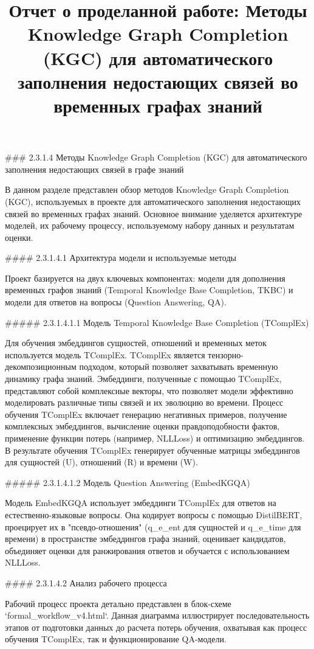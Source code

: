 \documentclass{article}
\title{Отчет о проделанной работе: Методы Knowledge Graph Completion (KGC) для автоматического заполнения недостающих связей во временных графах знаний}
\author{}
\date{}
\begin{document}
\maketitle

### 2.3.1.4 Методы Knowledge Graph Completion (KGC) для автоматического заполнения недостающих связей в графе знаний

В данном разделе представлен обзор методов Knowledge Graph Completion (KGC), используемых в проекте для автоматического заполнения недостающих связей во временных графах знаний. Основное внимание уделяется архитектуре моделей, их рабочему процессу, используемому набору данных и результатам оценки.

#### 2.3.1.4.1 Архитектура модели и используемые методы

Проект базируется на двух ключевых компонентах: модели для дополнения временных графов знаний (Temporal Knowledge Base Completion, TKBC) и модели для ответов на вопросы (Question Answering, QA).

##### 2.3.1.4.1.1 Модель Temporal Knowledge Base Completion (TComplEx)

Для обучения эмбеддингов сущностей, отношений и временных меток используется модель TComplEx. TComplEx является тензорно-декомпозиционным подходом, который позволяет захватывать временную динамику графа знаний. Эмбеддинги, полученные с помощью TComplEx, представляют собой комплексные векторы, что позволяет модели эффективно моделировать различные типы связей и их эволюцию во времени. Процесс обучения TComplEx включает генерацию негативных примеров, получение комплексных эмбеддингов, вычисление оценки правдоподобности фактов, применение функции потерь (например, NLLLoss) и оптимизацию эмбеддингов. В результате обучения TComplEx генерирует обученные матрицы эмбеддингов для сущностей (U), отношений (R) и времени (W).

##### 2.3.1.4.1.2 Модель Question Answering (EmbedKGQA)

Модель EmbedKGQA использует эмбеддинги TComplEx для ответов на естественно-языковые вопросы. Она кодирует вопросы с помощью DistilBERT, проецирует их в "псевдо-отношения" (q_e_ent для сущностей и q_e_time для времени) в пространстве эмбеддингов графа знаний, оценивает кандидатов, объединяет оценки для ранжирования ответов и обучается с использованием NLLLoss.

#### 2.3.1.4.2 Анализ рабочего процесса

Рабочий процесс проекта детально представлен в блок-схеме `formal_workflow_v4.html`. Данная диаграмма иллюстрирует последовательность этапов от подготовки данных до расчета потерь обучения, охватывая как процесс обучения TComplEx, так и функционирование QA-модели.
\end{document}
